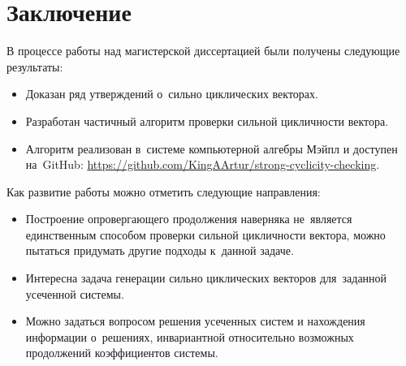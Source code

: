 \section{Заключение}

В процессе работы над магистерской диссертацией были получены следующие результаты:

\begin{itemize}
	\item
		Доказан ряд утверждений о~сильно циклических векторах.
	\item
		Разработан частичный алгоритм проверки сильной цикличности вектора.
	\item
		Алгоритм реализован в~системе компьютерной алгебры Мэйпл и доступен на~GitHub:
		\url{https://github.com/KingAArtur/strong-cyclicity-checking}.
\end{itemize}

Как развитие работы можно отметить следующие направления:

\begin{itemize}
	\item
		Построение опровергающего продолжения наверняка не~является единственным способом проверки сильной цикличности вектора,
        можно пытаться придумать другие подходы к~данной задаче.
	\item
		Интересна задача генерации сильно циклических векторов для~заданной усеченной системы.
	\item
		Можно задаться вопросом решения усеченных систем и нахождения информации о~решениях,
        инвариантной относительно возможных продолжений коэффициентов системы.
\end{itemize}
